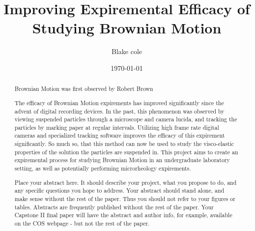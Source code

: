 \documentclass[aps,prb,twocolumn,groupedaddress,nofootinbib,floatfix]{revtex4}
\begin{document}
%
\title{Improving Expiremental Efficacy of Studying Brownian Motion}

%
\author{Blake cole}
%
%
%
%

\date{\today}

\begin{abstract} \noindent Brownian Motion was first observed by Robert Brown

The efficacy of Brownian Motion expirements has improved significantly since the advent of digital recording devices. In the past, this phenomenon was observed by viewing suspended particles through a microscope and camera lucida, and tracking the particles by marking paper at regular intervals. Utilizing high frame rate digital cameras and specialized tracking software improves the efficacy of this expirement significantly. So much so, that this method can now be used to study the visco-elastic properties of the solution the particles are suspended in. This project aims to create an expiremental process for studying Brownian Motion in an undergraduate laboratory setting, as well as potentially performing microrheology expirements.  

Place your abstract here.  It should describe your project, what you propose to do, and any specific questions you hope to address.   Your abstract should stand alone, and make sense without the rest of the paper.   Thus you should not refer to your figures or tables.   Abstracts are frequently published without the rest of the paper.   Your Capstone II final paper will have the abstract and author info, for example, available on the COS webpage - but not the rest of the paper.
\end{abstract}

\maketitle
\end{document}

